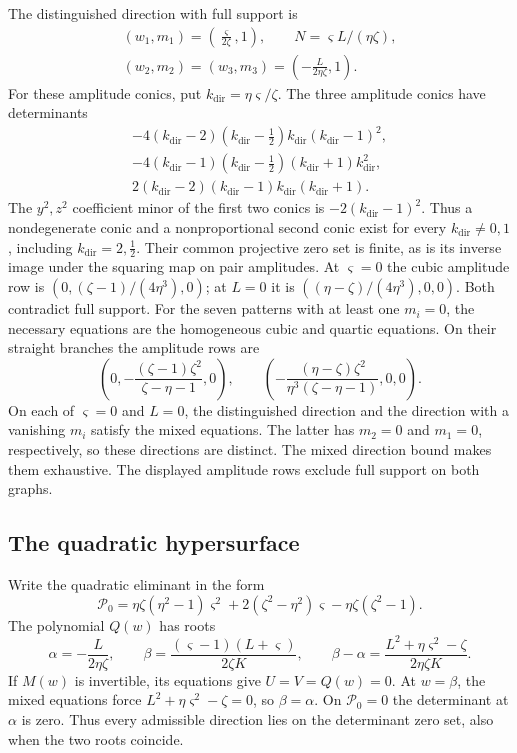 \documentclass[11pt,a4paper]{article}
\numberwithin{equation}{section}
\theoremstyle{plain}
\theoremstyle{definition}
\theoremstyle{remark}
\begin{document}
The distinguished direction with full support is
\[
 \begin{gathered}
 (w_1,m_1)=\left(\frac{\varsigma }{2\zeta },1\right),\qquad N=\varsigma L/(\eta \zeta ),\\
 (w_2,m_2)=(w_3,m_3)=\left(-\frac{L}{2\eta \zeta },1\right).
 \end{gathered}
\]
For these amplitude conics, put
$k_{\mathrm{dir}}=\eta\varsigma/\zeta$. The three amplitude conics have determinants
\[
 \begin{gathered}
 -4(k_{\mathrm{dir}}-2)(k_{\mathrm{dir}}-\tfrac12)k_{\mathrm{dir}}(k_{\mathrm{dir}}-1)^2,\\
 -4(k_{\mathrm{dir}}-1)(k_{\mathrm{dir}}-\tfrac12)(k_{\mathrm{dir}}+1)k_{\mathrm{dir}}^2,\\
 2(k_{\mathrm{dir}}-2)(k_{\mathrm{dir}}-1)k_{\mathrm{dir}}(k_{\mathrm{dir}}+1).
 \end{gathered}
\]
The $y^2,z^2$ coefficient minor of the first two conics is
$-2(k_{\mathrm{dir}}-1)^2$. Thus a nondegenerate conic and a nonproportional second
conic exist for every $k_{\mathrm{dir}}\ne0,1$, including $k_{\mathrm{dir}}=2,\tfrac12$.
Their common projective zero set is finite, as is its inverse image
under the squaring map on pair amplitudes.
At $\varsigma=0$ the cubic amplitude row is
$(0,(\zeta-1)/(4\eta^3),0)$; at $L=0$ it is
$((\eta-\zeta)/(4\eta^3),0,0)$. Both contradict full support.
For the seven patterns with at least one $m_i=0$, the necessary
equations are the homogeneous cubic and quartic equations.
On their straight branches the amplitude rows are
\[
 \left(0,-\frac{(\zeta -1)\zeta ^2}{\zeta -\eta -1},0\right),\qquad
 \left(-\frac{(\eta -\zeta )\zeta ^2}{\eta ^3(\zeta -\eta -1)},0,0\right).
\]
On each of $\varsigma=0$ and $L=0$, the distinguished direction and
the direction with a vanishing $m_i$ satisfy the mixed equations.
The latter has $m_2=0$ and $m_1=0$, respectively, so these directions
are distinct. The mixed direction bound makes them exhaustive.
The displayed amplitude rows exclude full support on both graphs.

\subsection{The quadratic hypersurface}
\label{appr3fib:Bwall}

Write the quadratic eliminant in the form
\[
 \mathcal P_0=\eta \zeta (\eta ^2-1)\varsigma ^2+2(\zeta ^2-\eta ^2)\varsigma -\eta \zeta (\zeta ^2-1).
\]
The polynomial $Q(w)$ has roots
\[
 \alpha=-\frac{L}{2\eta \zeta },\qquad
 \beta=\frac{(\varsigma -1)(L+\varsigma )}{2\zeta K},\qquad
 \beta-\alpha=\frac{L^2+\eta \varsigma ^2-\zeta }{2\eta \zeta K}.
\]
If $M(w)$ is invertible, its equations give
$U=V=Q(w)=0$. At $w=\beta$, the mixed equations force
$L^2+\eta\varsigma^2-\zeta=0$, so $\beta=\alpha$.
On $\mathcal P_0=0$ the determinant at $\alpha$ is zero.
Thus every admissible direction lies on the determinant zero set,
also when the two roots coincide.
\end{document}
